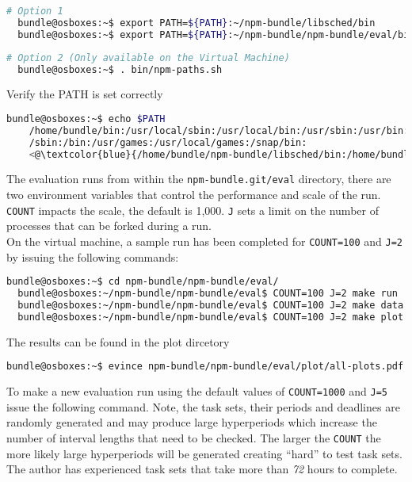 \documentclass[a4paper]{article}
\begin{document}
\begin{lstlisting}[language=bash]
  # Option 1
  bundle@osboxes:~$ export PATH=${PATH}:~/npm-bundle/libsched/bin
  bundle@osboxes:~$ export PATH=${PATH}:~/npm-bundle/npm-bundle/eval/bin
\end{lstlisting}

\begin{lstlisting}[language=bash]
  # Option 2 (Only available on the Virtual Machine)
  bundle@osboxes:~$ . bin/npm-paths.sh
\end{lstlisting}

{\noindent}Verify the PATH is set correctly
\begin{lstlisting}[language=bash]
  bundle@osboxes:~$ echo $PATH
    /home/bundle/bin:/usr/local/sbin:/usr/local/bin:/usr/sbin:/usr/bin:
    /sbin:/bin:/usr/games:/usr/local/games:/snap/bin:
    <@\textcolor{blue}{/home/bundle/npm-bundle/libsched/bin:/home/bundle/npm-bundle/npm-bundle/eval/bin}@>
\end{lstlisting}


{\noindent}The evaluation runs from within the \texttt{npm-bundle.git/eval}
directory, there are two environment variables that control the
performance and scale of the run. \texttt{COUNT} impacts the scale,
the default is 1,000. \texttt{J} sets a limit on the number of
processes that can be forked during a run.\\


{\noindent}On the virtual machine, a sample run has been completed for
\texttt{COUNT=100} and \texttt{J=2} by issuing the following commands:

\begin{lstlisting}[language=bash]
  bundle@osboxes:~$ cd npm-bundle/npm-bundle/eval/
  bundle@osboxes:~/npm-bundle/npm-bundle/eval$ COUNT=100 J=2 make run
  bundle@osboxes:~/npm-bundle/npm-bundle/eval$ COUNT=100 J=2 make data
  bundle@osboxes:~/npm-bundle/npm-bundle/eval$ COUNT=100 J=2 make plot
\end{lstlisting}

{\noindent}The results can be found in the plot dircetory
\begin{lstlisting}[language=bash]
  bundle@osboxes:~$ evince npm-bundle/npm-bundle/eval/plot/all-plots.pdf
\end{lstlisting}

{\noindent}To make a new evaluation run using the default values of
\texttt{COUNT=1000} and \texttt{J=5} issue the following
command. Note, the task sets, their periods and deadlines are randomly
generated and may produce large hyperperiods which increase the number
of interval lengths that need to be checked. The larger the
\texttt{COUNT} the more likely large hyperperiods will be generated
creating ``hard'' to test task sets. The author has experienced task
sets that take more than \emph{72} hours to complete.
\end{document}
